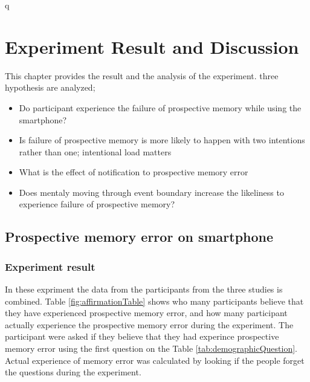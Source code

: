 q
\chapter{Experiment Result and Discussion}

This chapter provides the result and the analysis of the experiment. three hypothesis are analyzed;
\begin{itemize}
  \item{Do participant experience the failure of prospective memory while using the smartphone?}
  \item{Is failure of prospective memory is more likely to happen with two intentions rather than one; intentional load matters}
  \item{What is the effect of notification to prospective memory error}
  \item{Does mentaly moving through event boundary increase the likeliness to experience failure of prospective memory?}
\end{itemize}

\section{Prospective memory error on smartphone}

\subsection{Experiment result}
In these expriment the data from the participants from the three studies is combined.
Table \ref{fig:affirmationTable} shows who many participants believe that they have experienced prospective memory error,
and how many participant actually experience the prospective memory error during the experiment.
The participant were asked if they believe that they had experince prospective memory error using the first question on the Table \ref{tab:demographicQuestion}.
Actual experience of memory error was calculated by looking if the people forget the questions during the experiment.


